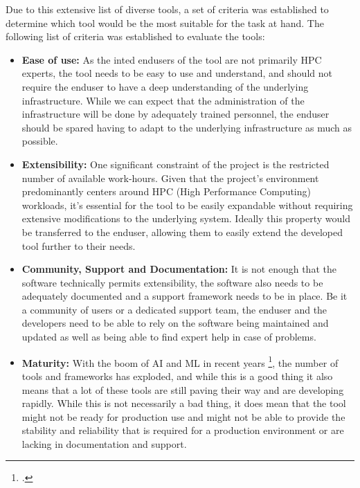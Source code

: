 Due to this extensive list of diverse tools, a set of criteria was established to determine which tool would be the most suitable for the task at hand.
The following list of criteria was established to evaluate the tools:

\begin{itemize}
    \item \textbf{Ease of use:} 
        As the inted endusers of the tool are not primarily \ac{HPC} experts, the tool needs to be easy to use and understand,
        and should not require the enduser to have a deep understanding of the underlying infrastructure.
        While we can expect that the administration of the infrastructure will be done by adequately trained personnel, 
        the enduser should be spared having to adapt to the underlying infrastructure as much as possible.

    \item \textbf{Extensibility:}
        One significant constraint of the project is the restricted number of available work-hours.
        Given that the project's environment predominantly centers around HPC (High Performance Computing) workloads,
        it's essential for the tool to be easily expandable without requiring extensive modifications to the underlying system.
        Ideally this property would be transferred to the enduser, allowing them to easily extend the developed tool further to their needs.

    \item \textbf{Community, Support and  Documentation:}
        It is not enough that the software technically permits extensibility, the software also needs to be adequately documented and a support framework needs to be in place.
        Be it a community of users or a dedicated support team, the enduser and the developers need to be able to rely on the software being maintained and updated as well as being able to find expert help in case of problems.

    \item \textbf{Maturity:}
        With the boom of \ac{AI} and \ac{ML} in recent years \footcite{24TopAI}, the number of tools and frameworks has exploded, and while this is a good thing it also means that a lot of these tools are still paving their way and are developing rapidly.
        While this is not necessarily a bad thing, it does mean that the tool might not be ready for production use and might not be able to provide the stability and reliability that is required for a production environment or are lacking in documentation and support.      


\end{itemize}
